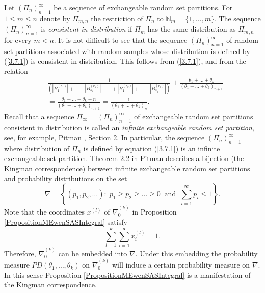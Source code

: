 \documentclass[12pt]{amsart}
\theoremstyle{definition}
\numberwithin{equation}{section}
\begin{document}
Let $\left(\Pi_n\right)_{n=1}^{\infty}$ be a sequence of exchangeable
random set partitions. For $1\leq m\leq n$ denote by $\Pi_{m,n}$
the restriction of $\Pi_n$ to $\mathbb{N}_m=\{1,\ldots,m\}$.
The sequence $\left(\Pi_n\right)_{n=1}^{\infty}$ is \textit{consistent in distribution} if $\Pi_m$ has the same distribution as $\Pi_{m,n}$
for every $m<n$. It is not difficult to see that the sequence $\left(\Pi_n\right)_{n=1}^{\infty}$ of random set partitions associated
with random samples whose distribution is defined by (\ref{3.7.1})
is consistent in distribution. This follows from (\ref{3.7.1}), and from the relation
\begin{equation}
\begin{split}
&\frac{1}{\left(|B_1^{(r_1)}|+\ldots+|B_{s_1}^{(r_1)}|
+\ldots+|B_1^{(r_q)}|+\ldots+|B_{s_q}^{(r_q)}|\right)}
+\frac{\theta_1+\ldots+\theta_k}{\left(\theta_1+\ldots+\theta_k\right)_{n+1}}\\
&=\frac{\theta_1+\ldots+\theta_k+n}{\left(\theta_1+\ldots+\theta_k\right)_{n+1}}
=\frac{1}{\left(\theta_1+\ldots+\theta_k\right)_{n}}.
\end{split}
\end{equation}
Recall that a sequence $\Pi_{\infty}=\left(\Pi_n\right)_{n=1}^{\infty}$
of exchangeable random set partitions consistent in distribution
is called an \textit{infinite exchangeable random set partition},
see, for example, Pitman \cite{PitmanBookCombinatorialProcesses},
Section 2. In particular, the sequence $\left(\Pi_n\right)_{n=1}^{\infty}$ where distribution of $\Pi_n$
is defined by equation (\ref{3.7.1}) is an infinite exchangeable set partition. Theorem 2.2 in Pitman \cite{PitmanBookCombinatorialProcesses}
describes a bijection (the Kingman correspondence) between infinite
exchangeable random set partitions and probability distributions
on the set
$$
\nabla=\left\{\left(p_1,p_2,\ldots\right):\;
p_1\geq p_2\geq\ldots\geq 0\;\;\mbox{and}\;\;\sum\limits_{i=1}^{\infty}p_i\leq 1\right\}.
$$
Note that the coordinates $x^{(l)}$ of $\overline{\nabla}_0^{(k)}$ in Proposition \ref{PropositionMEwenSASIntegral} satisfy
$$
\sum\limits_{l=1}^k\sum\limits_{i=1}^{\infty}x_i^{(l)}=1.
$$
Therefore,  $\overline{\nabla}_0^{(k)}$ can be embedded into
$\nabla$. Under this embedding the probability measure $PD\left(\theta_1,\ldots,\theta_k\right)$ on   $\overline{\nabla}_0^{(k)}$ will induce a certain probability measure
on $\nabla$. In this sense Proposition  \ref{PropositionMEwenSASIntegral}
is a manifestation of the Kingman correspondence.
\end{document}
